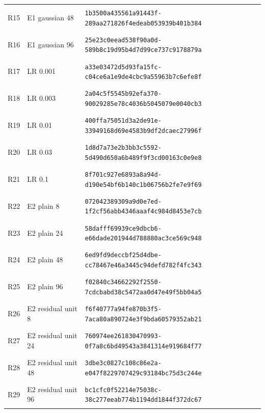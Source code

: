 \begin{longtable}{@{}l>{\raggedright\arraybackslash}p{3.5cm}p{10.8cm}@{}}
\hypertarget{R15}{R15} & E1 gaussian 48 & {\fontsize{8.8}{11}\selectfont\texttt{1b3500a435561a91443f-289aa271826f4edeab053939b401b384}} \\
\hypertarget{R16}{R16} & E1 gaussian 96 & {\fontsize{8.8}{11}\selectfont\texttt{25e23c0eead538f90a0d-589b8c19d95b4d7d99ce737c9178879a}} \\
\hypertarget{R17}{R17} & LR 0.001 & {\fontsize{8.8}{11}\selectfont\texttt{a33e03472d5d93fa15fc-c04ce6a1e9de4cbc9a55963b7c6efe8f}} \\
\hypertarget{R18}{R18} & LR 0.003 & {\fontsize{8.8}{11}\selectfont\texttt{2a04c5f5545b92efa370-90029285e78c4036b5045079e0040cb3}} \\
\hypertarget{R19}{R19} & LR 0.01 & {\fontsize{8.8}{11}\selectfont\texttt{400ffa75051d3a2de91e-33949168d69e4583b9df2dcaec27996f}} \\
\hypertarget{R20}{R20} & LR 0.03 & {\fontsize{8.8}{11}\selectfont\texttt{1d8d7a73e2b3bb3c5592-5d490d650a6b489f9f3cd00163c0e9e8}} \\
\hypertarget{R21}{R21} & LR 0.1 & {\fontsize{8.8}{11}\selectfont\texttt{8f701c927e6893a8a94d-d190e54bf6b140c1b06756b2fe7e9f69}} \\
\hypertarget{R22}{R22} & E2 plain 8 & {\fontsize{8.8}{11}\selectfont\texttt{072042389309a9d0e7ed-1f2cf56abb4346aaaf4c984d8453e7cb}} \\
\hypertarget{R23}{R23} & E2 plain 24 & {\fontsize{8.8}{11}\selectfont\texttt{58dafff69939ce9dbcb6-e66dade201944d788880ac3ce569c948}} \\
\hypertarget{R24}{R24} & E2 plain 48 & {\fontsize{8.8}{11}\selectfont\texttt{6ed9fd9deccbf25d4dbe-cc78467e46a3445c94defd782f4fc343}} \\
\hypertarget{R25}{R25} & E2 plain 96 & {\fontsize{8.8}{11}\selectfont\texttt{f02840c34662292f2550-7cdcbabd38c5472aa0d47e49f5bb04a5}} \\
\hypertarget{R26}{R26} & E2 residual unit 8 & {\fontsize{8.8}{11}\selectfont\texttt{f6f40777a94fe870b3f5-7aca80a890724e3f9bda60579352ab21}} \\
\hypertarget{R27}{R27} & E2 residual unit 24 & {\fontsize{8.8}{11}\selectfont\texttt{760974ee261830470993-0f7a8c6bd49543a3841314e919684f77}} \\
\hypertarget{R28}{R28} & E2 residual unit 48 & {\fontsize{8.8}{11}\selectfont\texttt{3dbe3c0827c108c86e2a-e047f8229707429c93184bc75d3c244e}} \\
\hypertarget{R29}{R29} & E2 residual unit 96 & {\fontsize{8.8}{11}\selectfont\texttt{bc1cfc0f52214e75038c-38c277eeab774b1194dd1844f372dc67}} \\

\end{longtable}

